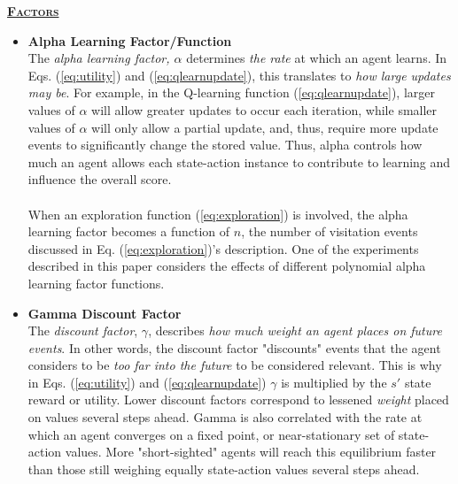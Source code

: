 \documentclass[12pt, letter]{article}
\newlength{\remaining}
\newcommand{\titleline}[1]{%
\setlength{\remaining}{\textwidth-\widthof{\textsc{#1}}}
\noindent\underline{\textsc{\textbf{#1}}\hspace*{\remaining}}\par}
\begin{document}
\titleline{Factors}
\begin{itemize}
    \item \textbf{Alpha Learning Factor/Function}\\ The \emph{alpha learning factor, $\alpha$} determines \emph{the rate} at which an agent learns.  In Eqs. (\ref{eq:utility}) and (\ref{eq:qlearnupdate}), this translates to \emph{how large updates may be}.  For example, in the Q-learning function (\ref{eq:qlearnupdate}), larger values of $\alpha$ will allow greater updates to occur each iteration, while smaller values of $\alpha$ will only allow a partial update, and, thus, require more update events to significantly change the stored value.  Thus, alpha controls how much an agent allows each state-action instance to contribute to learning and influence the overall score.\\
    \\
    When an exploration function (\ref{eq:exploration}) is involved, the alpha learning factor becomes a function of $n$, the number of visitation events discussed in Eq. (\ref{eq:exploration})'s description.  One of the experiments described in this paper considers the effects of different polynomial alpha learning factor functions.
    \item \textbf{Gamma Discount Factor} \\ The \emph{discount factor}, $\gamma$, describes \emph{how much weight an agent places on future events}.  In other words, the discount factor "discounts" events that the agent considers to be \emph{too far into the future} to be considered relevant.  This is why in Eqs. (\ref{eq:utility}) and (\ref{eq:qlearnupdate}) $\gamma$ is multiplied by the $s'$ state reward or utility.  Lower discount factors correspond to lessened \emph{weight} placed on values several steps ahead.  Gamma is also correlated with the rate at which an agent converges on a fixed point, or near-stationary set of state-action values.  More "short-sighted" agents will reach this equilibrium faster than those still weighing equally state-action values several steps ahead.
\end{itemize}
\end{document}
